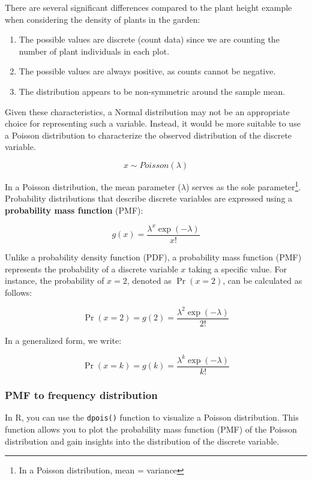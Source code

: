 \documentclass[
]{article}
\begin{document}
There are several significant differences compared to the plant height example when considering the density of plants in the garden:

\begin{enumerate}
\def\labelenumi{\arabic{enumi}.}
\item
  The possible values are discrete (count data) since we are counting the number of plant individuals in each plot.
\item
  The possible values are always positive, as counts cannot be negative.
\item
  The distribution appears to be non-symmetric around the sample mean.
\end{enumerate}

Given these characteristics, a Normal distribution may not be an appropriate choice for representing such a variable. Instead, it would be more suitable to use a Poisson distribution to characterize the observed distribution of the discrete variable.

\[
x \sim Poisson(\lambda)
\]

In a Poisson distribution, the mean parameter (\(\lambda\)) serves as the sole parameter\footnote{In a Poisson distribution, mean = variance}. Probability distributions that describe discrete variables are expressed using a \textbf{probability mass function} (PMF):

\[
g(x) = \frac{\lambda^x \exp(-\lambda)}{x!}
\]

Unlike a probability density function (PDF), a probability mass function (PMF) represents the probability of a discrete variable \(x\) taking a specific value. For instance, the probability of \(x=2\), denoted as \(\Pr(x=2)\), can be calculated as follows:

\[
\Pr(x=2) = g(2) = \frac{\lambda^2 \exp(-\lambda)}{2!}
\]

In a generalized form, we write:

\[
\Pr(x=k) = g(k) = \frac{\lambda^k \exp(-\lambda)}{k!}
\]

\hypertarget{pmf-to-frequency-distribution}{%
\subsubsection{PMF to frequency distribution}\label{pmf-to-frequency-distribution}}

In R, you can use the \texttt{dpois()} function to visualize a Poisson distribution. This function allows you to plot the probability mass function (PMF) of the Poisson distribution and gain insights into the distribution of the discrete variable.
\end{document}
